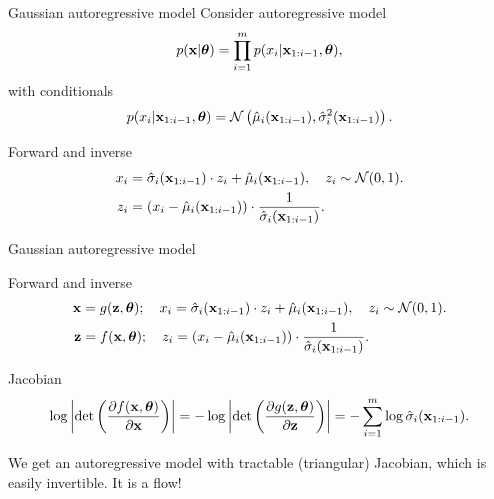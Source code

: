 

\begin{frame}
\titlepage
\end{frame}
\begin{frame}{Gaussian autoregressive model}
	Consider autoregressive model
	\[
		p(\mathbf{x} | \boldsymbol{\theta}) = \prod_{i=1}^m p(x_i | \mathbf{x}_{1:i - 1}, \boldsymbol{\theta}),
	\]
	with conditionals
	\[
		p(x_i | \mathbf{x}_{1:i - 1}, \boldsymbol{\theta}) = \mathcal{N} \left(\hat{\mu}_i(\mathbf{x}_{1:i-1}), \hat{\sigma}^2_i (\mathbf{x}_{1:i-1})\right).
	\]
	\vspace{-0.5cm}
	\begin{block}{Forward and inverse}
		\vspace{-0.3cm}
		\begin{align*}
			x_i &= \hat{\sigma}_i (\mathbf{x}_{1:i-1}) \cdot z_i + \hat{\mu}_i(\mathbf{x}_{1:i-1}), \quad z_i \sim \mathcal{N}(0, 1). \\
			z_i &= \left(x_i - \hat{\mu}_i(\mathbf{x}_{1:i-1}) \right) \cdot \frac{1}{\hat{\sigma}_i (\mathbf{x}_{1:i-1}) }.
		\end{align*}
	\end{block}
\end{frame}
\begin{frame}{Gaussian autoregressive model}
	\begin{block}{Forward and inverse}
		\vspace{-0.3cm}
		\begin{align*}
			\mathbf{x} &= g(\mathbf{z}, \boldsymbol{\theta}); \quad x_i = \hat{\sigma}_i (\mathbf{x}_{1:i-1}) \cdot z_i + \hat{\mu}_i(\mathbf{x}_{1:i-1}), \quad z_i \sim \mathcal{N}(0, 1). \\
			\mathbf{z} &= f(\mathbf{x}, \boldsymbol{\theta}); \quad z_i = \left(x_i - \hat{\mu}_i(\mathbf{x}_{1:i-1}) \right) \cdot \frac{1}{\hat{\sigma}_i (\mathbf{x}_{1:i-1}) }.
		\end{align*}
	\vspace{-0.3cm}
	\end{block}
	\begin{block}{Jacobian}
		\vspace{-0.3cm}
		\[
		\log \left|\det \left( \frac{\partial f(\mathbf{x}, \boldsymbol{\theta})}{\partial \mathbf{x}} \right) \right| = -\log \left|\det \left( \frac{\partial g(\mathbf{z}, \boldsymbol{\theta})}{\partial \mathbf{z}} \right) \right| = - \sum_{i = 1}^m \log \hat{\sigma}_i (\mathbf{x}_{1:i-1}).
		\]
		\vspace{-0.3cm}
	\end{block} 
	We get an autoregressive model with tractable (triangular) Jacobian, which is easily invertible. It is a flow!
\end{frame}
